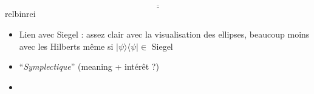 \[\underline{\overline{\qquad\qquad\qquad\qquad\qquad\qquad\qquad\qquad\qquad\qquad\qquad\qquad\qquad\qquad\qquad\qquad\qquad\qquad}}\]{\color{white}relbinrei}

\begin{itemize}
	\item Lien avec Siegel : assez clair avec la visualisation des ellipses, beaucoup moins avec les Hilberts même si $| \psi\rangle \langle \psi |\in$ Siegel \apriori
	
	\item ``\textit{Symplectique}'' (meaning + intérêt ?)
	
	\item 
\end{itemize}




\newpage

\listoffigures
\vfill
\lstlistoflistings
\vfill

\newpage

{}

